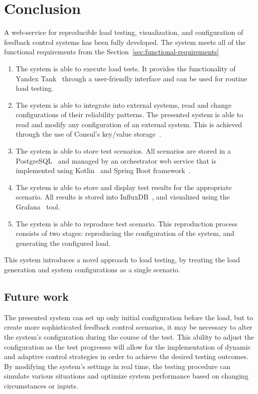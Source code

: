\chapter{Conclusion}
\label{ch:conclustion}

A web-service for reproducible load testing, visualization, and configuration of feedback control systems has been fully developed. The system meets all of the functional requirements from the Section~\ref{sec:functional-requirements}
\begin{enumerate}
    \item The system is able to execute load tests. It provides the functionality of Yandex Tank~\cite{yandex_tank} through a user-friendly interface and can be used for routine load testing.
    \item The system is able to integrate into external systems, read and change configurations of their reliability patterns. The presented system is able to read and modify any configuration of an external system. This is achieved through the use of Consul's key/value storage~\cite{consul}.
    \item The system is able to store test scenarios. All scenarios are stored in a PostgreSQL~\cite{postgresql} and managed by an orchestrator web service that is implemented using Kotlin~\cite{kotlin} and Spring Boot framework~\cite{spring}.
    \item The system is able to store and display test results for the appropriate scenario. All results is stored into InfluxDB~\cite{influxdb}, and visualized using the Grafana~\cite{grafana} tool.
    \item The system is able to reproduce test scenario. This reproduction process consists of two stages: reproducing the configuration of the system, and generating the configured load.
\end{enumerate}
This system introduces a novel approach to load testing, by treating the load generation and system configurations as a single scenario.

\section{Future work}\label{sec:future}
The presented system can set up only initial configuration before the load, but to create more sophisticated feedback control scenarios, it may be necessary to alter the system's configuration during the course of the test.
This ability to adjust the configuration as the test progresses will allow for the implementation of dynamic and adaptive control strategies in order to achieve the desired testing outcomes. By modifying the system's settings in real time, the testing procedure can simulate various situations and optimize system performance based on changing circumstances or inputs.